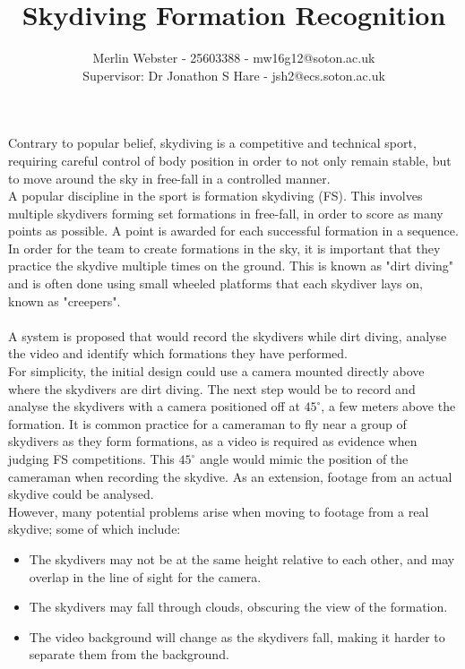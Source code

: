 \documentclass[a4paper, 11pt]{article}
\begin{document}
%
\setlength{\droptitle}{-7em}
\title{\textbf{Skydiving Formation Recognition}}
\author{Merlin Webster - 25603388 - mw16g12@soton.ac.uk \\Supervisor: Dr Jonathon S Hare - jsh2@ecs.soton.ac.uk}
\date{}
\maketitle{}
%
\thispagestyle{empty}
%
\noindent Contrary to popular belief, skydiving is a competitive and technical sport, requiring careful control of body position in order to not only remain stable, but to move around the sky in free-fall in a controlled manner.\\
A popular discipline in the sport is formation skydiving (FS). This involves multiple skydivers forming set formations in free-fall, in order to score as many points as possible. A point is awarded for each successful formation in a sequence.
\\
In order for the team to create formations in the sky, it is important that they practice the skydive multiple times on the ground. This is known as "dirt diving" and is often done using small wheeled platforms that each skydiver lays on, known as "creepers".
\\\\
A system is proposed that would record the skydivers while dirt diving, analyse the video and identify which formations they have performed.\\
For simplicity, the initial design could use a camera mounted directly above where the skydivers are dirt diving.
The next step would be to record and analyse the skydivers with a camera positioned off at $45^\circ$, a few meters above the formation.
It is common practice for a cameraman to fly near a group of skydivers as they form formations, as a video is required as evidence when judging FS competitions.
This $45^\circ$ angle would mimic the position of the cameraman when recording the skydive.
As an extension, footage from an actual skydive could be analysed.\\
However, many potential problems arise when moving to footage from a real skydive; some of which include:
\begin{itemize}
	\item The skydivers may not be at the same height relative to each other, and may overlap in the line of sight for the camera.
	\item The skydivers may fall through clouds, obscuring the view of the formation.
	\item The video background will change as the skydivers fall, making it harder to separate them from the background.
\end{itemize}
\end{document}
